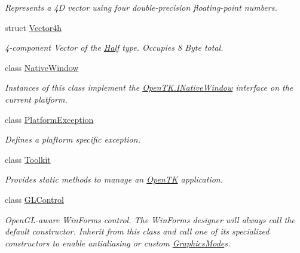 \begin{DoxyCompactItemize}
\begin{DoxyCompactList}\small\item\em Represents a 4\-D vector using four double-\/precision floating-\/point numbers.\end{DoxyCompactList}\item 
struct \hyperlink{struct_open_t_k_1_1_vector4h}{Vector4h}
\begin{DoxyCompactList}\small\item\em 4-\/component Vector of the \hyperlink{struct_open_t_k_1_1_half}{Half} type. Occupies 8 Byte total. \end{DoxyCompactList}\item 
class \hyperlink{class_open_t_k_1_1_native_window}{Native\-Window}
\begin{DoxyCompactList}\small\item\em Instances of this class implement the \hyperlink{interface_open_t_k_1_1_i_native_window}{Open\-T\-K.\-I\-Native\-Window} interface on the current platform. \end{DoxyCompactList}\item 
class \hyperlink{class_open_t_k_1_1_platform_exception}{Platform\-Exception}
\begin{DoxyCompactList}\small\item\em Defines a plaftorm specific exception.\end{DoxyCompactList}\item 
class \hyperlink{class_open_t_k_1_1_toolkit}{Toolkit}
\begin{DoxyCompactList}\small\item\em Provides static methods to manage an \hyperlink{namespace_open_t_k}{Open\-T\-K} application. \end{DoxyCompactList}\item 
class \hyperlink{class_open_t_k_1_1_g_l_control}{G\-L\-Control}
\begin{DoxyCompactList}\small\item\em Open\-G\-L-\/aware Win\-Forms control. The Win\-Forms designer will always call the default constructor. Inherit from this class and call one of its specialized constructors to enable antialiasing or custom \hyperlink{class_open_t_k_1_1_g_l_control_a09e08e21b3fd710f8b2b310441e414d4}{Graphics\-Mode}s. \end{DoxyCompactList}\end{DoxyCompactItemize}
